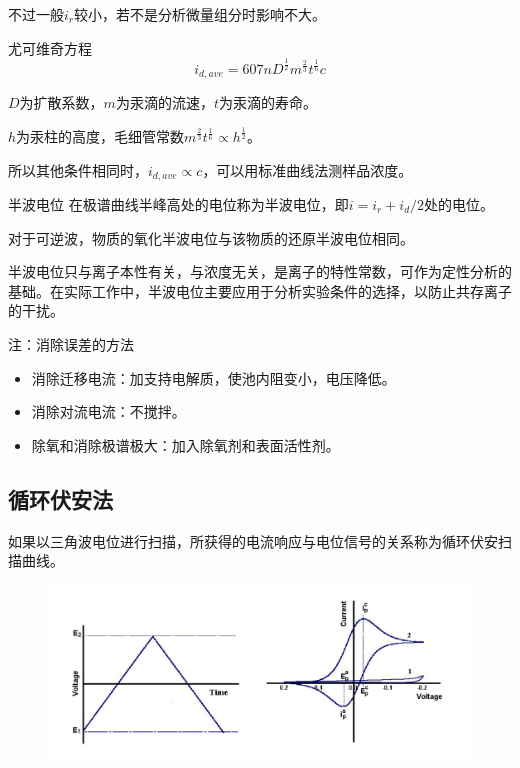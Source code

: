 不过一般$i_r$较小，若不是分析微量组分时影响不大。

\begin{theorem*}{尤可维奇方程}{}
	\begin{equation*}
		i_{d,ave}=607nD^{\frac{1}{2}}m^{\frac{2}{3}}t^{\frac{1}{6}}c
	\end{equation*}
	
	$D$为扩散系数，$m$为汞滴的流速，$t$为汞滴的寿命。
	
	$h$为汞柱的高度，毛细管常数$m^{\frac{2}{3}}t^{\frac{1}{6}}\propto h^{\frac{1}{2}}$。
\end{theorem*}

所以其他条件相同时，$i_{d,ave}\propto c$，可以用标准曲线法测样品浓度。

\begin{definition*}{半波电位}{}
	在极谱曲线半峰高处的电位称为半波电位，即$i=i_r+i_d/2$处的电位。
	
	对于可逆波，物质的氧化半波电位与该物质的还原半波电位相同。	
\end{definition*}

半波电位只与离子本性有关，与浓度无关，是离子的特性常数，可作为定性分析的基础。在实际工作中，半波电位主要应用于分析实验条件的选择，以防止共存离子的干扰。

注：消除误差的方法
\begin{itemize}
	\item 消除迁移电流：加支持电解质，使池内阻变小，电压降低。
	\item 消除对流电流：不搅拌。
	\item 除氧和消除极谱极大：加入除氧剂和表面活性剂。
\end{itemize}

\subsection{循环伏安法}
如果以三角波电位进行扫描，所获得的电流响应与电位信号的关系称为循环伏安扫描曲线。
\begin{figure}[!h]
	\centering
	\includegraphics[width=0.8\linewidth]{image/chp7_circular_VA}
	\label{fig:chp7circularva}
\end{figure}

